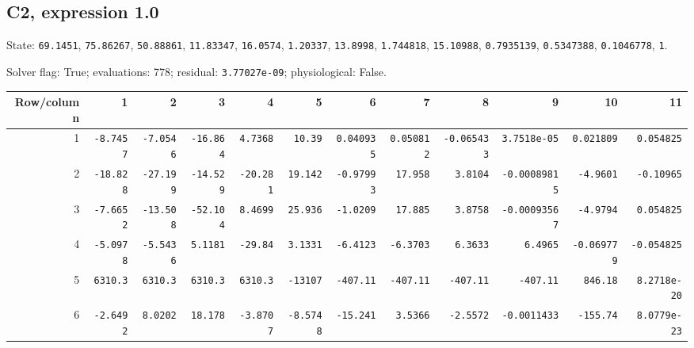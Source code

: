 \begin{landscape}
\subsection*{C2, expression 1.0}
{\scriptsize State: \texttt{69.1451}, \texttt{75.86267}, \texttt{50.88861}, \texttt{11.83347}, \texttt{16.0574}, \texttt{1.20337}, \texttt{13.8998}, \texttt{1.744818}, \texttt{15.10988}, \texttt{0.7935139}, \texttt{0.5347388}, \texttt{0.1046778}, \texttt{1}.\par

Solver flag: True; evaluations: 778; residual: \texttt{3.77027e-09}; physiological: False.\par}

\begingroup\scriptsize\setlength{\tabcolsep}{3pt}\centering
\begin{tabular}{rrrrrrrrrrrr}\toprule

Row/column & 1 & 2 & 3 & 4 & 5 & 6 & 7 & 8 & 9 & 10 & 11 \\ \midrule

1 & \texttt{-8.7457} & \texttt{-7.0546} & \texttt{-16.864} & \texttt{4.7368} & \texttt{10.39} & \texttt{0.040935} & \texttt{0.050812} & \texttt{-0.065433} & \texttt{3.7518e-05} & \texttt{0.021809} & \texttt{0.054825} \\

2 & \texttt{-18.828} & \texttt{-27.199} & \texttt{-14.529} & \texttt{-20.281} & \texttt{19.142} & \texttt{-0.97993} & \texttt{17.958} & \texttt{3.8104} & \texttt{-0.00089815} & \texttt{-4.9601} & \texttt{-0.10965} \\

3 & \texttt{-7.6652} & \texttt{-13.508} & \texttt{-52.104} & \texttt{8.4699} & \texttt{25.936} & \texttt{-1.0209} & \texttt{17.885} & \texttt{3.8758} & \texttt{-0.00093567} & \texttt{-4.9794} & \texttt{0.054825} \\

4 & \texttt{-5.0978} & \texttt{-5.5436} & \texttt{5.1181} & \texttt{-29.84} & \texttt{3.1331} & \texttt{-6.4123} & \texttt{-6.3703} & \texttt{6.3633} & \texttt{6.4965} & \texttt{-0.069779} & \texttt{-0.054825} \\

5 & \texttt{6310.3} & \texttt{6310.3} & \texttt{6310.3} & \texttt{6310.3} & \texttt{-13107} & \texttt{-407.11} & \texttt{-407.11} & \texttt{-407.11} & \texttt{-407.11} & \texttt{846.18} & \texttt{8.2718e-20} \\

6 & \texttt{-2.6492} & \texttt{8.0202} & \texttt{18.178} & \texttt{-3.8707} & \texttt{-8.5748} & \texttt{-15.241} & \texttt{3.5366} & \texttt{-2.5572} & \texttt{-0.0011433} & \texttt{-155.74} & \texttt{8.0779e-23} \\


\end{tabular}
\end{landscape}
